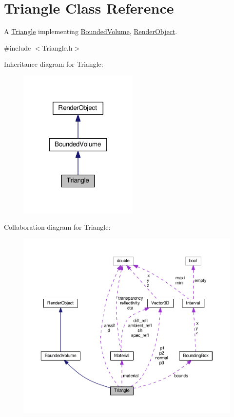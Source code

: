 \hypertarget{classTriangle}{}\section{Triangle Class Reference}
\label{classTriangle}


A \hyperlink{classTriangle}{Triangle} implementing \hyperlink{classBoundedVolume}{Bounded\+Volume}, \hyperlink{classRenderObject}{Render\+Object}.  




{\ttfamily \#include $<$Triangle.\+h$>$}



Inheritance diagram for Triangle\+:\nopagebreak
\begin{figure}[H]
\begin{center}
\leavevmode
\includegraphics[width=168pt]{classTriangle__inherit__graph}
\end{center}
\end{figure}


Collaboration diagram for Triangle\+:\nopagebreak
\begin{figure}[H]
\begin{center}
\leavevmode
\includegraphics[width=350pt]{classTriangle__coll__graph}
\end{center}
\end{figure}
